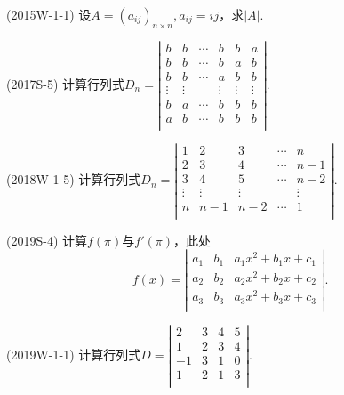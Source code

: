 \documentclass[lang=cn,newtx,10pt,scheme=chinese]{elegantbook}
\begin{document}
\begin{exercise}
  (2015W-1-1) 设$A=(a_{ij})_{n \times n}, a_{ij} = ij$，求$\left| A \right|.$
\end{exercise}

\begin{exercise}
  (2017S-5) 计算行列式$
  D_n = 
  \left|
	\begin{array}{cccccc}
		b       & b       & \cdots & b      & b       & a       \\
		b       & b       & \cdots & b      & a       & b       \\
		b       & b       & \cdots & a      & b       & b       \\
		\vdots  & \vdots  &        & \vdots & \vdots  & \vdots  \\
		b       & a       & \cdots & b      & b       & b       \\
		a       & b       & \cdots & b      & b       & b       \\
	\end{array}
  \right|
  .
  $
\end{exercise}

\begin{exercise}
  (2018W-1-5) 计算行列式$
  D_n = 
  \left|
	\begin{array}{ccccc}
		1       & 2       & 3       & \cdots  & n       \\
		2       & 3       & 4       & \cdots  & n-1     \\
		3       & 4       & 5       & \cdots  & n-2     \\
		\vdots  & \vdots  & \vdots  &         & \vdots  \\
		n       & n-1     & n-2     & \cdots  & 1       \\
	\end{array}
  \right|
  .
  $
\end{exercise}

\begin{exercise}
  (2019S-4) 计算$f(\pi)$与$f'(\pi)$，此处
  $$
    f(x) =
    \left|
	\begin{array}{ccc}
		a_1 & b_1 & a_1 x^2 + b_1 x + c_1 \\
		a_2 & b_2 & a_2 x^2 + b_2 x + c_2 \\
		a_3 & b_3 & a_3 x^2 + b_3 x + c_3 \\
	\end{array}
    \right|
	.
  $$
\end{exercise}

\begin{exercise}
  (2019W-1-1) 计算行列式$D = 
  \left|
	\begin{array}{cccc}
		2   & 3   & 4   & 5 \\
		1   & 2   & 3   & 4 \\
		-1  & 3   & 1   & 0 \\
		1   & 2   & 1   & 3 \\
	\end{array}
  \right|
  .
  $
\end{exercise}
\end{document}
